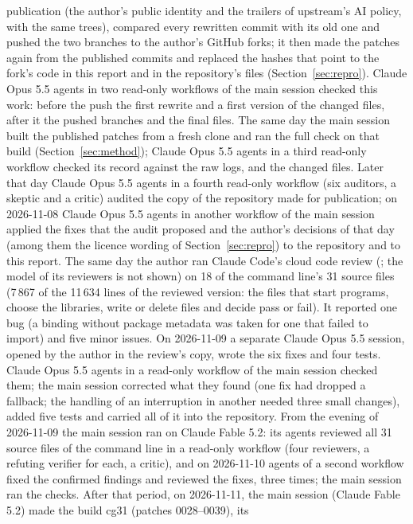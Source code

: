 publication (the author's public identity and the trailers of upstream's AI policy, with the same trees), compared
every rewritten commit with its old one and pushed the two branches to the author's GitHub forks; it then made the
patches again from the published commits and replaced the hashes that point to the fork's code in this report and
in the repository's files (Section~\ref{sec:repro}). Claude Opus 5.5 agents in two read-only workflows of the main
session checked this work: before the push the first rewrite and a first version of the changed files, after it the
pushed branches and the final files. The same day the main session built the published patches from a fresh clone
and ran the full check on that build (Section~\ref{sec:method}); Claude Opus 5.5 agents in a third read-only
workflow checked its record against the raw logs, and the changed files. Later that day Claude Opus 5.5 agents in a
fourth read-only workflow (six auditors, a skeptic and a critic) audited the copy of the repository made for
publication; on 2026-11-08 Claude Opus 5.5 agents in another workflow of the main session applied the fixes that the
audit proposed and the author's decisions of that day (among them the licence wording of Section~\ref{sec:repro}) to
the repository and to this report. The same day the author ran Claude Code's cloud code review
(; the model of its reviewers is not shown) on 18 of the command line's 31 source files
(7\,867 of the 11\,634 lines of the reviewed version: the files that start programs, choose the libraries, write or
delete files and decide pass or fail). It reported one bug (a binding without package metadata was taken for one that failed to import) and
five minor issues. On 2026-11-09 a separate Claude Opus 5.5 session, opened by the author in the review's copy, wrote
the six fixes and four tests. Claude Opus 5.5 agents in a read-only workflow of the main session checked them; the main
session corrected what they found (one fix had dropped a fallback; the handling of an interruption in another needed
three small changes), added five tests and carried all of it into the repository.
From the evening of 2026-11-09 the main session ran on Claude Fable 5.2: its agents reviewed all 31 source files of
the command line in a read-only workflow (four reviewers, a refuting verifier for each, a critic), and on 2026-11-10
agents of a second workflow fixed the confirmed findings and reviewed the fixes, three times; the main session ran the
checks.
After that period, on 2026-11-11, the main session (Claude Fable 5.2) made the build cg31 (patches 0028--0039), its
